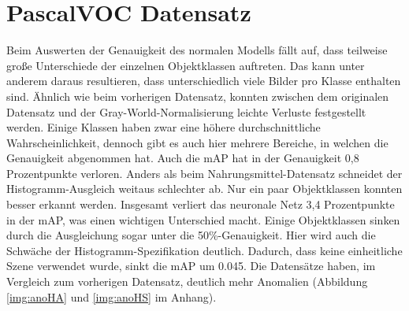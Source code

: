 \section{PascalVOC Datensatz}
Beim Auswerten der Genauigkeit des normalen Modells fällt auf, dass teilweise große Unterschiede der einzelnen Objektklassen auftreten. Das kann unter anderem daraus resultieren, dass unterschiedlich viele Bilder pro Klasse enthalten sind. Ähnlich wie beim vorherigen Datensatz, konnten zwischen dem originalen Datensatz und der Gray-World-Normalisierung leichte Verluste festgestellt werden. Einige Klassen haben zwar eine höhere durchschnittliche Wahrscheinlichkeit, dennoch gibt es auch hier mehrere Bereiche, in welchen die Genauigkeit abgenommen hat. Auch die mAP hat in der Genauigkeit 0,8 Prozentpunkte verloren. Anders als beim Nahrungsmittel-Datensatz schneidet der Histogramm-Ausgleich weitaus schlechter ab. Nur ein paar Objektklassen konnten besser erkannt werden. Insgesamt verliert das neuronale Netz 3,4 Prozentpunkte in der mAP, was einen wichtigen Unterschied macht. Einige Objektklassen sinken durch die Ausgleichung sogar unter die 50\%-Genauigkeit. Hier wird auch die Schwäche der Histogramm-Spezifikation deutlich. Dadurch, dass keine einheitliche Szene verwendet wurde, sinkt die mAP um 0.045. Die Datensätze haben, im Vergleich zum vorherigen Datensatz, deutlich mehr Anomalien (Abbildung \ref{img:anoHA} und \ref{img:anoHS} im Anhang).
